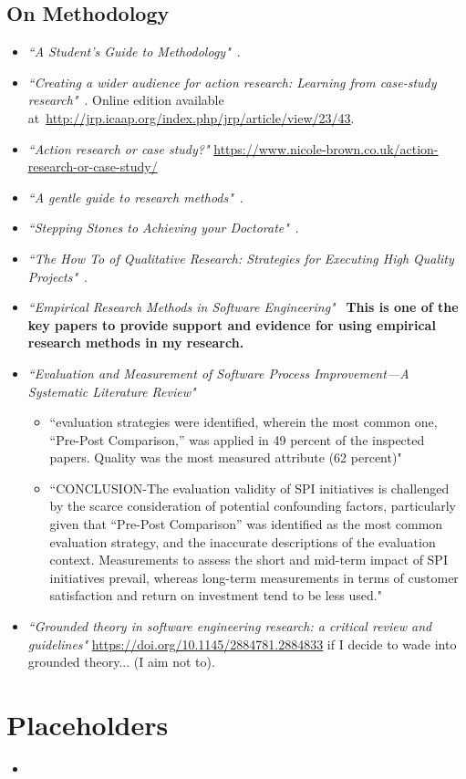 \subsection{On Methodology}
\begin{itemize}
    \item \emph{``A Student's Guide to Methodology"}~\citep{clough2012_students_guide_to_methodology}.
    \item \emph{``Creating a wider audience for action research: Learning from case-study research"}~\citep{blichfeldt2006creating}. Online edition available at~\url{http://jrp.icaap.org/index.php/jrp/article/view/23/43}.
    \item \emph{``Action research or case study?"} \url{https://www.nicole-brown.co.uk/action-research-or-case-study/}
    \item \emph{``A gentle guide to research methods"}~\citep{rugg2006_gentle_guide_to_research_methods}.
    \item \emph{``Stepping Stones to Achieving your Doctorate"}~\citep{trafford2008_stepping_stones_to_achieving_your_doctorate}.
    \item \emph{``The How To of Qualitative Research: Strategies for Executing High Quality Projects"}~\citep{aurini2016_how_to_of_qualitative_research}.
    \item \emph{``Empirical Research Methods in Software Engineering"}~\citep{Wohlin2003_empirical_research_methods_in_software_engineering} \textbf{This is one of the key papers to provide support and evidence for using empirical research methods in my research.}
    \item \emph{``Evaluation and Measurement of Software Process Improvement—A Systematic Literature Review"}~\citep{unterkalmsteiner2012_evaluation_and_measurement_of_spi_a_slr}
    \begin{itemize}
        \item ``evaluation strategies were identified, wherein the most common one, “Pre-Post Comparison,” was applied in 49 percent of the inspected papers. Quality was the most measured attribute (62 percent)"
        \item ``CONCLUSION-The evaluation validity of SPI initiatives is challenged by the scarce consideration of potential confounding factors, particularly given that “Pre-Post Comparison” was identified as the most common evaluation strategy, and the inaccurate descriptions of the evaluation context. Measurements to assess the short and mid-term impact of SPI initiatives prevail, whereas long-term measurements in terms of customer satisfaction and return on investment tend to be less used."
    \end{itemize}
    \item \emph{``Grounded theory in software engineering research: a critical review and guidelines"} \url{https://doi.org/10.1145/2884781.2884833} if I decide to wade into grounded theory... (I aim not to).
\end{itemize}


\section{Placeholders}
\begin{itemize}
    \item \citep{soiferman2010_compare_and_contrast_inductive_and_deductive_research_approaches}
\end{itemize}
